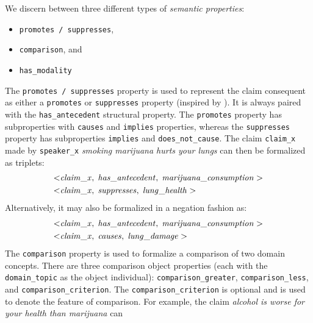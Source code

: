 We discern between three different types of \emph{semantic properties}:
\begin{itemize}
\item \texttt{promotes / suppresses},
\item \texttt{comparison}, and
\item \texttt{has\_modality}
\end{itemize}
The \texttt{promotes / suppresses} property is used to represent the claim
consequent as either a \texttt{promotes} or \texttt{suppresses} property
(inspired by \citet{hashimoto2012excitatory}). It is always paired with
the \texttt{has\_antecedent} structural property. The \texttt{promotes}
property has subproperties with \texttt{causes} and \texttt{implies}
properties, whereas the \texttt{suppresses} property has 
subproperties \texttt{implies} and \texttt{does\_not\_cause}.
The claim \texttt{claim\_x} made by \texttt{speaker\_x}
\emph{smoking marijuana hurts your lungs} can then be formalized as triplets:
\begin{align*}
	< & \mathit{claim\_x}, \hspace{0.1cm} \mathit{has\_antecedent}, \hspace{0.1cm}
	\mathit{marijuana\_consumption} > \\
	< & \mathit{claim\_x}, \hspace{0.1cm} \mathit{suppresses}, \hspace{0.1cm}
	\mathit{lung\_health} > 
\end{align*}
Alternatively, it may also be formalized in a negation fashion as:
\begin{align*}
	< & \mathit{claim\_x}, \hspace{0.1cm} \mathit{has\_antecedent}, \hspace{0.1cm}
	\mathit{marijuana\_consumption} > \\
	< & \mathit{claim\_x}, \hspace{0.1cm} \mathit{causes}, \hspace{0.1cm}
	\mathit{lung\_damage} > 
\end{align*}
The \texttt{comparison} property is used to formalize a comparison of 
two domain concepts. There are three comparison object properties (each with the
\texttt{domain\_topic} as the object individual): \texttt{comparison\_greater},
\texttt{comparison\_less}, and \texttt{comparison\_criterion}. The
\texttt{comparison\_criterion} is optional and is used to denote the feature of 
comparison. For example, the claim \emph{alcohol is worse for your health than marijuana} can
